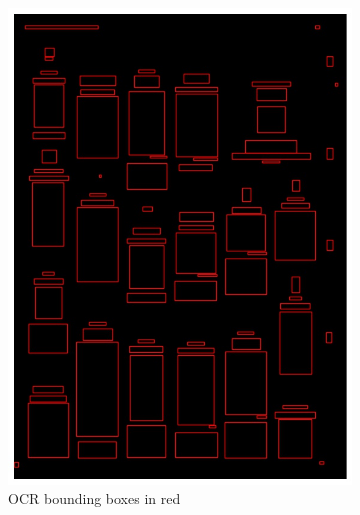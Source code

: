 \documentclass[oneside, english, bibtex]{kththesis}
\begin{document}
\begin{figure}[!htb]
\begin{adjustbox}{center,max size={\textwidth}{0.9\textheight}}
\parbox{1.5\textwidth}{\lineskip=0pt
\begin{subfigure}{0.6\textwidth}
  \centering
  \includegraphics[width=\linewidth, clip=true, trim = 0mm 0mm 0mm 0mm]{figures/ocr/GQU6vjW.jpg}
  \caption{OCR bounding boxes in red}
  \label{fig:GQU6vjW_OCR}
\end{subfigure}%
\begin{subfigure}{0.6\textwidth}
  \centering

\end{subfigure}}
\end{adjustbox}
\end{figure}
\end{document}
